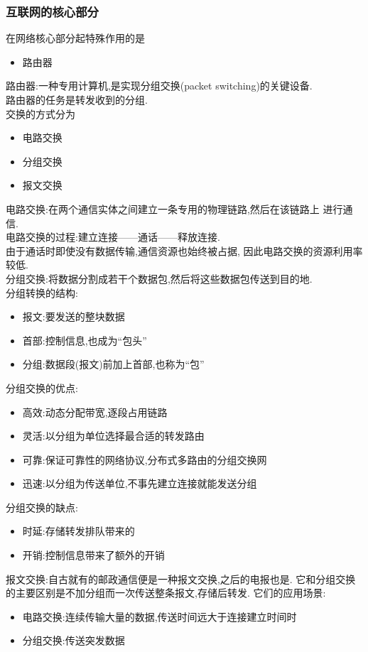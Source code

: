 \documentclass{ctexart}
\begin{document}
\subsubsection{互联网的核心部分}
在网络核心部分起特殊作用的是
\begin{itemize}
    \item 路由器
\end{itemize}
路由器:一种专用计算机,是实现分组交换(packet switching)的关键设备.\\
路由器的任务是转发收到的分组.\\
交换的方式分为
\begin{itemize}
    \item 电路交换
    \item 分组交换
    \item 报文交换
\end{itemize}
电路交换:在两个通信实体之间建立一条专用的物理链路,然后在该链路上
进行通信.\\
电路交换的过程:建立连接——通话——释放连接.\\
由于通话时即使没有数据传输,通信资源也始终被占据,
因此电路交换的资源利用率较低.\\
分组交换:将数据分割成若干个数据包,然后将这些数据包传送到目的地.\\
分组转换的结构:
\begin{itemize}
    \item 报文:要发送的整块数据
    \item 首部:控制信息,也成为“包头”
    \item 分组:数据段(报文)前加上首部,也称为“包”
\end{itemize}
分组交换的优点:
\begin{itemize}
    \item 高效:动态分配带宽,逐段占用链路
    \item 灵活:以分组为单位选择最合适的转发路由
    \item 可靠:保证可靠性的网络协议,分布式多路由的分组交换网
    \item 迅速:以分组为传送单位,不事先建立连接就能发送分组
\end{itemize}
分组交换的缺点:
\begin{itemize}
    \item 时延:存储转发排队带来的
    \item 开销:控制信息带来了额外的开销
\end{itemize}
报文交换:自古就有的邮政通信便是一种报文交换,之后的电报也是.
它和分组交换的主要区别是不加分组而一次传送整条报文,存储后转发.
它们的应用场景:
\begin{itemize}
   \item 电路交换:连续传输大量的数据,传送时间远大于连接建立时间时
    \item 分组交换:传送突发数据
\end{itemize}
\end{document}
